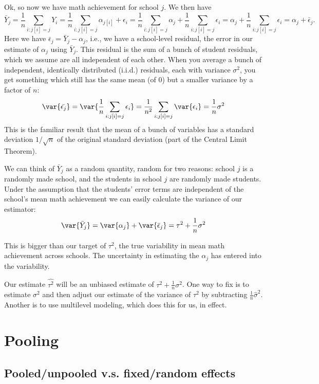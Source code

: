 \documentclass[
  letterpaper,
  DIV=11,
  numbers=noendperiod]{scrreprt}
\begin{document}
Ok, so now we have math achievement for school \(j\). We then have
\[\bar{Y}_j = \frac{1}{n} \sum_{i : j[i] = j} Y_i  = \frac{1}{n} \sum_{i : j[i] = j} \alpha_{j[i]} + \epsilon_i =   \frac{1}{n} \sum_{i : j[i] = j} \alpha_j +  \frac{1}{n} \sum_{i : j[i] = j} \epsilon_i = \alpha_j +  \frac{1}{n} \sum_{i : j[i] = j}\epsilon_i = \alpha_j + \bar{\epsilon}_j .\]
Here we have \(\bar{\epsilon}_j = \bar{Y}_j - \alpha_j\), i.e., we have
a school-level residual, the error in our estimate of \(\alpha_j\) using
\(\bar{Y}_j\). This residual is the sum of a bunch of student residuals,
which we assume are all independent of each other. When you average a
bunch of independent, identically distributed (i.i.d.) residuals, each
with variance \(\sigma^2\), you get something which still has the same
mean (of 0) but a smaller variance by a factor of \(n\):
\[\var{ \bar{\epsilon_j} } = \var{  \frac{1}{n} \sum_{i : j[i] = j}\epsilon_i } = \frac{1}{n^2} \sum_{i : j[i] = j} \var{ \epsilon_i } =  \frac{1}{n} \sigma^2\]
This is the familiar result that the mean of a bunch of variables has a
standard deviation \(1/\sqrt{n}\) of the original standard deviation
(part of the Central Limit Theorem).

We can think of \(\bar{Y}_j\) as a random quantity, random for two
reasons: school \(j\) is a randomly made school, and the students in
school \(j\) are randomly made students. Under the assumption that the
students' error terms are independent of the school's mean math
achievement we can easily calculate the variance of our estimator:
\[\var{ \bar{Y}_j } = \var{ \alpha_j } + \var{ \bar{\epsilon}_j } =   \tau^2 +  \frac{1}{n} \sigma^2\]

This is bigger than our target of \(\tau^2\), the true variability in
mean math achievement across schools. The uncertainty in estimating the
\(\alpha_j\) has entered into the variability.

Our estimate \(\widehat{\tau^2}\) will be an unbiased estimate of
\(\tau^2 + \frac{1}{n} \sigma^2\). One way to fix is to estimate
\(\sigma^2\) and then adjust our estimate of the variance of \(\tau^2\)
by subtracting \(\frac{1}{n} \hat{\sigma}^2\). Another is to use
multilevel modeling, which does this for us, in effect.

\hypertarget{pooling}{%
\chapter{Pooling}\label{pooling}}

\hypertarget{pooledunpooled-v.s.-fixedrandom-effects}{%
\section{Pooled/unpooled v.s. fixed/random
effects}\label{pooledunpooled-v.s.-fixedrandom-effects}}
\end{document}
